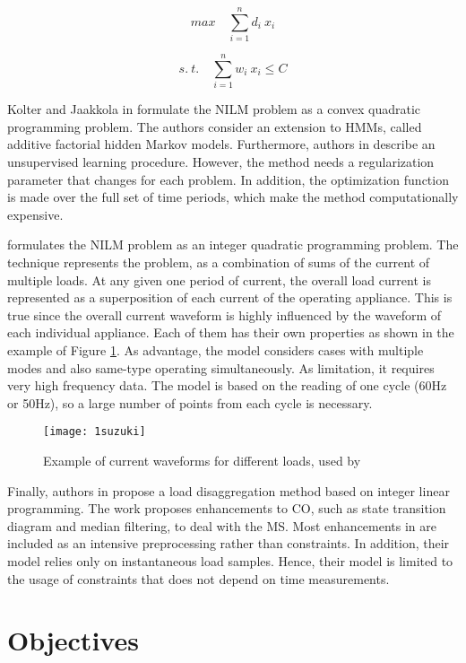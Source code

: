 \begin{equation} \label{knap}
   max \quad \sum_{i=1}^{n} d_i \ x_i
\end{equation}

$$ s. \ t. \quad \sum_{i=1}^{n} w_i \ x_i \leq C $$

Kolter and Jaakkola in \cite{afhmm} formulate the NILM problem as a convex quadratic programming problem. The authors consider an extension to HMMs, called additive factorial hidden Markov models. Furthermore, authors in \cite{afhmm} describe an unsupervised learning procedure. However, the method needs a regularization parameter that changes for each problem. In addition, the optimization function is made over the full set of time periods, which make the method computationally expensive.

\cite{suzuki} formulates the NILM problem as an integer quadratic programming problem. The technique represents the problem, as a combination of sums of the current of multiple loads. 
At any given one period of current, the overall load current is represented as a superposition of each current of the operating appliance. This is true since the overall current waveform is highly influenced by the waveform of each individual appliance. Each of them has their own properties as shown in the example of Figure \ref{1suzuki}. As advantage, the model considers cases with multiple modes and also same-type operating simultaneously. As limitation, it requires very high frequency data. The model is based on the reading of one cycle (60Hz or 50Hz), so a large number of points from each cycle is necessary.


\begin{figure}
    \centering
    \texttt{[image: 1suzuki]}
    \caption{Example of current waveforms for different loads, used by \cite{suzuki}}
    \label{1suzuki}
\end{figure}

Finally, authors in \cite{bhotto2016} propose a load disaggregation method based on integer linear programming. The work proposes enhancements to CO, such as state transition diagram and median filtering, to deal with the MS. Most enhancements in \cite{bhotto2016} are included as an intensive preprocessing rather than constraints. In addition, their model relies only on instantaneous load samples. Hence, their model is limited to the usage of constraints that does not depend on time measurements.

\section{Objectives}

